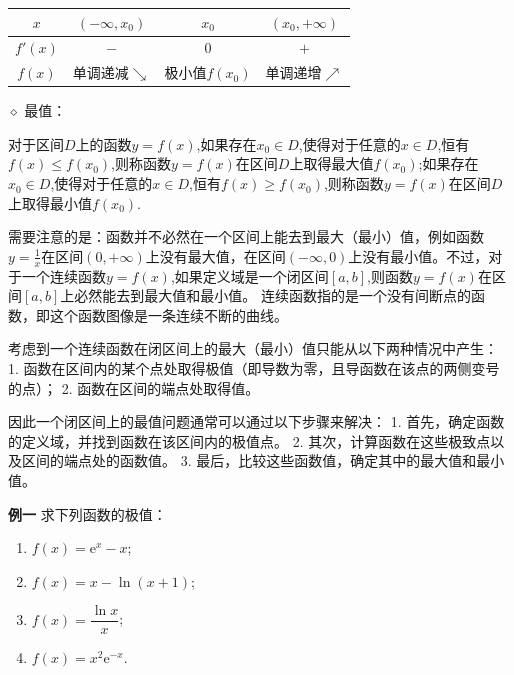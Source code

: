 \documentclass{article}
\begin{document}
\vspace{1em} %

\begin{center}
\begin{tabular}{|c|c|c|c|}
\hline
$x$ & $(-\infty,x_0)$ & $x_0$ & $(x_0,+\infty)$ \\
\hline
$f'(x)$ & $-$ & $0$ & $+$ \\
\hline
$f(x)$ & 单调递减$\searrow$ & 极小值$f(x_0)$ & 单调递增$\nearrow$ \\
\hline
\end{tabular}
\end{center}
\vspace{2\baselineskip}

$\diamond$  最值：
\vspace{1\baselineskip}

对于区间$D$上的函数$y=f(x)$,如果存在$x_0\in D$,使得对于任意的$x\in D$,恒有$f(x)\leq f(x_0)$,则称函数$y=f(x)$在区间$D$上取得最大值$f(x_0)$;如果存在$x_0\in D$,使得对于任意的$x\in D$,恒有$f(x)\geq f(x_0)$,则称函数$y=f(x)$在区间$D$上取得最小值$f(x_0)$.

需要注意的是：函数并不必然在一个区间上能去到最大（最小）值，例如函数$y=\frac{1}{x}$在区间$(0,+\infty)$上没有最大值，在区间$(-\infty,0)$上没有最小值。不过，对于一个连续函数$y=f(x)$,如果定义域是一个闭区间$[a,b]$,则函数$y=f(x)$在区间$[a,b]$上必然能去到最大值和最小值。
连续函数指的是一个没有间断点的函数，即这个函数图像是一条连续不断的曲线。

考虑到一个连续函数在闭区间上的最大（最小）值只能从以下两种情况中产生：
1. 函数在区间内的某个点处取得极值（即导数为零，且导函数在该点的两侧变号的点）；
2. 函数在区间的端点处取得值。

因此一个闭区间上的最值问题通常可以通过以下步骤来解决：
1. 首先，确定函数的定义域，并找到函数在该区间内的极值点。
2. 其次，计算函数在这些极致点以及区间的端点处的函数值。
3. 最后，比较这些函数值，确定其中的最大值和最小值。
\vspace{2\baselineskip}

\vspace{2\baselineskip}
\newpage

\noindent \textbf{例一} \;\;求下列函数的极值：
\begin{enumerate}
    \item \(f(x) = \mathrm{e}^x - x\);
    \item \(f(x) = x - \ln(x + 1)\);
    \item \(f(x) = \dfrac{\ln x}{x}\);
    \item \(f(x) = x^2 \mathrm{e}^{-x}\).
\end{enumerate}
\vspace{10\baselineskip}
\end{document}
